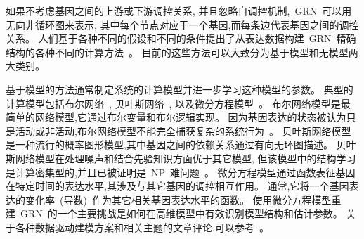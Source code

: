 如果不考虑基因之间的上游或下游调控关系,
并且忽略自调控机制,~GRN~可以用无向非循环图来表示,
其中每个节点对应于一个基因,而每条边代表基因之间的调控关系。
人们基于各种不同的假设和不同的条件提出了从表达数据构建~GRN~精确结构的各种不同的计算方法~\cite{longabaugh2005computational,karlebach2008modelling}。
目前的这些方法可以大致分为基于模型和无模型两大类别。

基于模型的方法通常制定系统的计算模型并进一步学习这种模型的参数。
典型的计算模型包括布尔网络~\cite{shmulevich2002probabilistic,kim2007boolean,bornholdt2008boolean,zhou2016relative},
贝叶斯网络~\cite{kim2003inferring,zou2004new,chen2006effective,needham2007primer,lo2015high},
以及微分方程模型~\cite{gardner2003inferring,di2005chemogenomic,bansal2006inference, honkela2010model,lu2011high,li2011large}。
布尔网络模型是最简单的网络模型,它通过布尔变量和布尔逻辑实现。
因为基因表达的状态被认为只是活动或非活动,布尔网络模型不能完全捕获复杂的系统行为~\cite{lee2009computational}。
贝叶斯网络模型是一种流行的概率图形模型,其中基因之间的依赖关系通过有向无环图描述。
贝叶斯网络模型在处理噪声和结合先验知识方面优于其它模型,
但该模型中的结构学习是计算密集型的,并且已被证明是~NP~难问题~\cite{chickering2004large}。
微分方程模型通过函数表征基因在特定时间的表达水平,其涉及与其它基因的调控相互作用。
通常,它将一个基因表达的变化率~(导数)~作为其它相关基因表达水平的函数。
使用微分方程模型重建~GRN~的一个主要挑战是如何在高维模型中有效识别模型结构和估计参数。
关于各种数据驱动建模方案和相关主题的文章评论,可以参考~\cite{hecker2009gene,marbach2012wisdom,wu2007inference,liu2012reverse,li2018control}。


